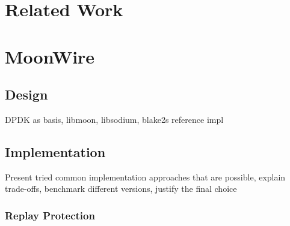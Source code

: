 \documentclass[IN,11pt,twoside,openright,master,english]{tumthesis}
\author{Maximilian~Pudelko}
\date{November 15, 2018}
\begin{document}
%


\maketitle%
\cleardoublepage


\begin{abstract}
	
\end{abstract}

\begin{otherlanguage}{ngerman}
	\begin{abstract}
		
	\end{abstract}
\end{otherlanguage}



\tableofcontents


\startcontent




\chapter{Related Work}
\label{chap:related_work}

\chapter{MoonWire}
\label{chap:moonwire}
\section{Design}
DPDK as basis, libmoon, libsodium, blake2s reference impl
\section{Implementation}
Present tried common implementation approaches that are possible, explain trade-offs, benchmark different versions, justify the final choice
\subsection{Replay Protection}
\end{document}
